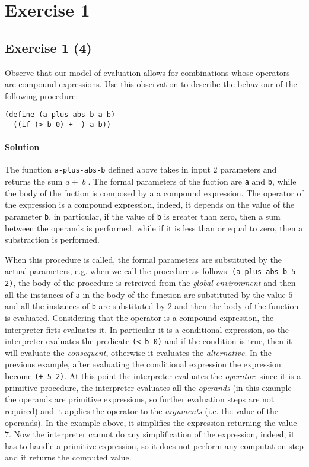 \section*{Exercise 1}

\subsection*{Exercise 1 (4)}
Observe that our model of evaluation allows for combinations whose operators are compound expressions. Use this observation to 
describe the behaviour of the following procedure:

\begin{lstlisting}
(define (a-plus-abs-b a b) 
  ((if (> b 0) + -) a b))
\end{lstlisting}

\paragraph{Solution}
The function \texttt{a-plus-abs-b} defined above takes in input 2 parameters and returns the sum $ a + |b| $. 
The formal parameters of the fuction are \texttt{a} and \texttt{b}, while the body of the fuction is composed by a 
a compound expression. The operator of the expression is a compound expression, indeed, it depends on the value of the
parameter \texttt{b}, in particular, if the value of \texttt{b} is greater than zero, then a sum between the operands is performed,
while if it is less than or equal to zero, then a substraction is performed.

When this procedure is called, the formal parameters are substituted by the actual parameters, e.g. when we call the procedure as
follows: \texttt{(a-plus-abs-b 5 2)}, the body of the procedure is retreived from the \textit{global environment} and then 
all the instances of \texttt{a} in the body of the function are substituted by the value
$ 5 $ and all the instances of \texttt{b} are substituted by $ 2 $ and then the body of the function is evaluated.
Considering that the operator is a compound expression, the interpreter firts evaluates it. 
In particular it is a conditional  expression, so the interpreter evaluates the predicate \texttt{(< b 0)} 
and if the condition is true, then it will evaluate the \textit{consequent}, otherwise it evaluates the \textit{alternative}.
In the previous example, after evaluating the conditional expression the expression become \texttt{(+ 5 2)}.
At this point the interpreter evaluates the \textit{operator}: since it is a primitive procedure, the interpreter evaluates all the 
\textit{operands} (in this example the operands are primitive expressions, so further evaluation steps are not required) and it
applies the operator to the \textit{arguments} (i.e. the value of the operands).
In the example above, it simplifies the expression returning the value $7$.
Now the interpreter cannot do any simplification of the expression, indeed, it has to handle a primitive expression, so 
it does not perform any computation step and it returns the computed value.


